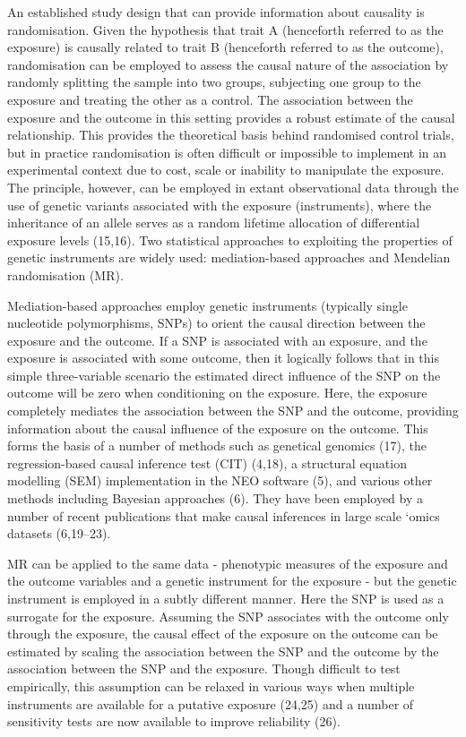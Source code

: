 \documentclass[]{article}
\begin{document}
An established study design that can provide information about causality
is randomisation. Given the hypothesis that trait A (henceforth referred
to as the exposure) is causally related to trait B (henceforth referred
to as the outcome), randomisation can be employed to assess the causal
nature of the association by randomly splitting the sample into two
groups, subjecting one group to the exposure and treating the other as a
control. The association between the exposure and the outcome in this
setting provides a robust estimate of the causal relationship. This
provides the theoretical basis behind randomised control trials, but in
practice randomisation is often difficult or impossible to implement in
an experimental context due to cost, scale or inability to manipulate
the exposure. The principle, however, can be employed in extant
observational data through the use of genetic variants associated with
the exposure (instruments), where the inheritance of an allele serves as
a random lifetime allocation of differential exposure levels (15,16).
Two statistical approaches to exploiting the properties of genetic
instruments are widely used: mediation-based approaches and Mendelian
randomisation (MR).

Mediation-based approaches employ genetic instruments (typically single
nucleotide polymorphisms, SNPs) to orient the causal direction between
the exposure and the outcome. If a SNP is associated with an exposure,
and the exposure is associated with some outcome, then it logically
follows that in this simple three-variable scenario the estimated direct
influence of the SNP on the outcome will be zero when conditioning on
the exposure. Here, the exposure completely mediates the association
between the SNP and the outcome, providing information about the causal
influence of the exposure on the outcome. This forms the basis of a
number of methods such as genetical genomics (17), the regression-based
causal inference test (CIT) (4,18), a structural equation modelling
(SEM) implementation in the NEO software (5), and various other methods
including Bayesian approaches (6). They have been employed by a number
of recent publications that make causal inferences in large scale `omics
datasets (6,19--23).

MR can be applied to the same data - phenotypic measures of the exposure
and the outcome variables and a genetic instrument for the exposure -
but the genetic instrument is employed in a subtly different manner.
Here the SNP is used as a surrogate for the exposure. Assuming the SNP
associates with the outcome only through the exposure, the causal effect
of the exposure on the outcome can be estimated by scaling the
association between the SNP and the outcome by the association between
the SNP and the exposure. Though difficult to test empirically, this
assumption can be relaxed in various ways when multiple instruments are
available for a putative exposure (24,25) and a number of sensitivity
tests are now available to improve reliability (26).
\end{document}
